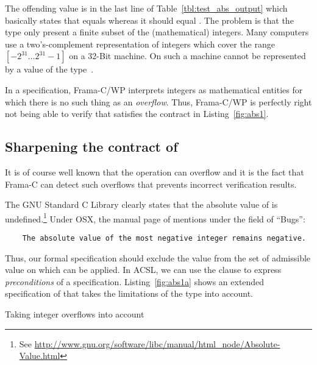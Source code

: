 The offending value is in the last line of Table~\ref{tbl:test_abs_output}
which basically states that  equals 
whereas it should equal .
The problem is that the type  only present a 
finite subset of the (mathematical) integers.
Many computers use a two's-complement representation of integers
which cover the range $[-2^{31}\ldots 2^{31}-1]$ on a 32-Bit machine.
On such a machine  cannot be  represented by a value
of the type~.

In a specification, Frama-C\slash WP interprets integers as mathematical entities
for which there is no such thing as an \emph{overflow}.
Thus, Frama-C\slash WP is perfectly right not being able to verify that 
satisfies the contract in Listing~\ref{fig:abs1}.

\subsection{Sharpening the contract of }

It is of course well known that the operation  can overflow
and it is the fact that Frama-C can detect such overflows that 
prevents incorrect verification results.

The GNU Standard C Library clearly states that the absolute value of
 is undefined.\footnote{%
  See \url{http://www.gnu.org/software/libc/manual/html_node/Absolute-Value.html}
}
Under \textsf{OSX}, the manual page of  mentions under the field of ``Bugs'':
%
\begin{small}
\begin{verbatim}
    The absolute value of the most negative integer remains negative.
\end{verbatim}
\end{small}

Thus, our formal specification should exclude the value 
from the set of admissible value on which  can be applied.
In ACSL, we can use the  clause to express \emph{preconditions}
of a specification.
Listing~\ref{fig:abs1a} shows an extended specification of 
that takes the limitations of the type  into account.

\begin{listing}[hbt]
\begin{minipage}{\textwidth}

\end{minipage}
\caption{\label{fig:abs1a} Taking integer overflows into account}
\end{listing}


